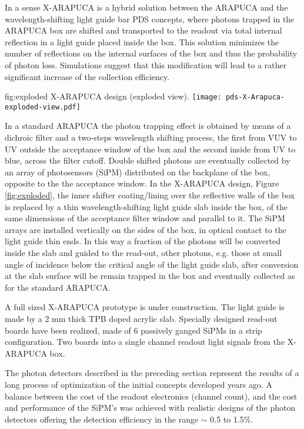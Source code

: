 In a sense X-ARAPUCA is a hybrid solution between the ARAPUCA and the wavelength-shifting light guide bar PDS concepts, 
where photons trapped in the ARAPUCA box are shifted and transported to the readout via total internal reflection in a light guide placed inside the box.
This solution minimizes the number of reflections on the internal surfaces of the box and thus the probability of photon loss. Simulations suggest that this modification will lead to a rather significant increase of the collection efficiency.

 \begin{dunefigure}{fig:exploded}
{X-ARAPUCA design (exploded view).}
   \texttt{[image: pds-X-Arapuca-exploded-view.pdf]}
\end{dunefigure}

 In a standard ARAPUCA the photon trapping effect is obtained by means of a dichroic filter and a two-steps wavelength shifting process, the first from VUV to UV outside the acceptance window of the box and the second inside from UV to blue, across the filter cutoff. Double shifted photons are eventually collected by an array of photosensors (SiPM) distributed on the backplane of the box, opposite to the the acceptance window. In the X-ARAPUCA design, Figure \ref{fig:exploded}, the inner shifter coating/lining over the reflective walls of the box is replaced by a thin wavelength-shifting light guide slab inside the box, of the same dimensions of the acceptance filter window and parallel to it. The SiPM arrays are installed vertically on the sides of the box, in optical contact to the light guide thin ends. 
 In this way a fraction of the photons will be converted inside the slab and guided to the read-out, other photons,  e.g. those at small angle of incidence below the critical angle of the light guide slab, after conversion at the slab surface will be remain trapped in the box and eventually collected as for the standard ARAPUCA.
 
 A full sized X-ARAPUCA prototype is under construction. The light guide is made by a 2 mm thick TPB doped acrylic slab. Specially designed read-out boards have been realized, made of 6 passively ganged SiPMs in a strip configuration.  Two boards into a single channel readout light signals from the X-ARAPUCA box. 
 
 The photon detectors described in the preceding section represent the results of a long process of optimization of the initial concepts developed years ago. A balance between the cost of the readout electronics (channel count), and the cost and performance of the SiPM's was achieved with realistic designs of the photon detectors offering the detection efficiency in the range $\sim$ 0.5 to 1.5\%.
 
